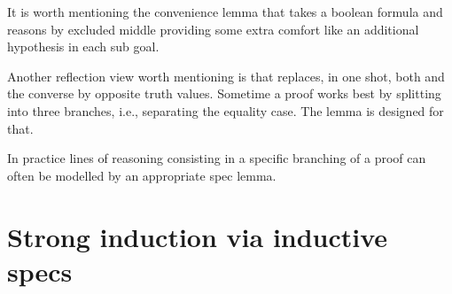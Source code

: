 It is worth mentioning the convenience lemma  that takes a boolean
formula and reasons by excluded middle providing some extra comfort
like an additional hypothesis in each sub goal.

Another reflection view worth mentioning is  that replaces, in one shot,
both \C{(_ <= _)} and the converse \C{(_ < _)} by opposite truth values.
Sometime a proof works best by splitting into three branches, i.e.,
separating the equality case. The  lemma is designed for that.

In practice lines of reasoning consisting in a specific branching of
a proof can often be modelled by an appropriate spec lemma.






\section{Strong induction via inductive specs}
\label{sec:ubnP}

